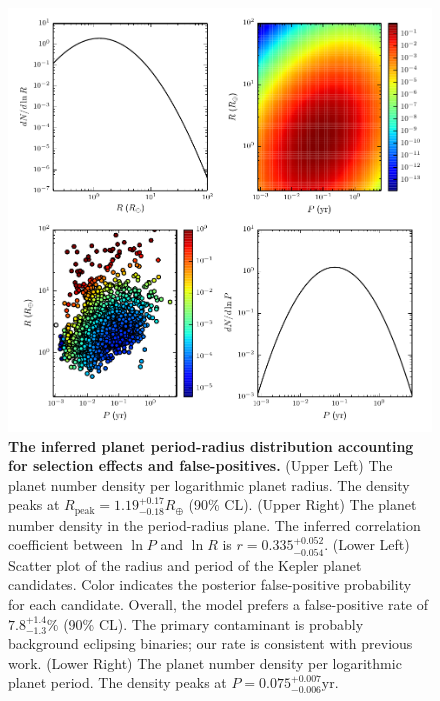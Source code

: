 \documentclass{nature}
\newcommand{\Rpeak}{R_\mathrm{peak}}
\newcommand{\REarth}{R_\oplus}
\begin{document}
\begin{figure}
  \includegraphics[width=\columnwidth]{foreground-dist}
  \caption{\label{fig:foreground-dist} \textbf{The inferred planet
      period-radius distribution accounting for selection effects and
      false-positives.}  (Upper Left) The planet number density per
    logarithmic planet radius.  The density peaks at $\Rpeak =
    1.19_{-0.18}^{+0.17} \REarth$ (90\% CL).  (Upper Right) The planet
    number density in the period-radius plane.  The inferred
    correlation coefficient between $\ln P$ and $\ln R$ is $r =
    0.335_{-0.054}^{+0.052}$.  (Lower Left) Scatter plot of the radius
    and period of the Kepler planet candidates.  Color indicates the
    posterior false-positive probability for each candidate.  Overall,
    the model prefers a false-positive rate of $7.8_{-1.3}^{+1.4}\%$
    (90\% CL).  The primary contaminant is probably background
    eclipsing binaries; our rate is consistent with previous
    work\cite{2013ApJ...766...81F}. (Lower Right) The planet number
    density per logarithmic planet period.  The density peaks at $P =
    0.075_{-0.006}^{+0.007}\mathrm{yr}$.}
\end{figure}
\end{document}
